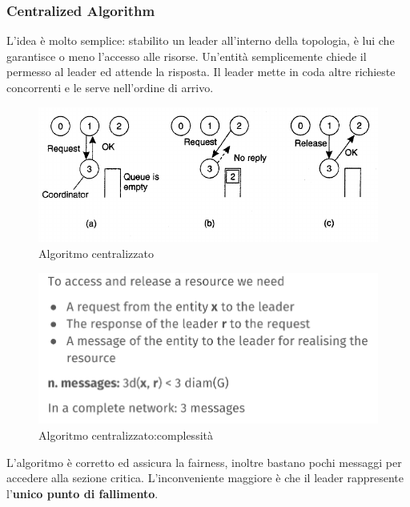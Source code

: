 \documentclass[12pt]{article}
\begin{document}
    	\subsubsection{Centralized Algorithm}
    		L'idea è molto semplice: stabilito un leader all'interno della topologia, è lui che garantisce o meno l'accesso alle risorse. Un'entità semplicemente chiede il permesso al leader ed attende la risposta. Il leader mette in coda altre richieste concorrenti e le serve nell'ordine di arrivo.
    		\begin{figure}[h!]
    			\centering
    			\includegraphics[scale=0.4]{img/mutua.png}
    			\caption{Algoritmo centralizzato}
    		\end{figure}
    		\begin{figure}[h!]
    			\centering
    			\includegraphics[scale=0.4]{img/mutuacomp.png}
    			\caption{Algoritmo centralizzato:complessità}
    		\end{figure}
    		L'algoritmo è corretto ed assicura la fairness, inoltre bastano pochi messaggi per accedere alla sezione critica. L'inconveniente maggiore è che il leader rappresente l'\textbf{unico punto di fallimento}.
    		
\end{document}
